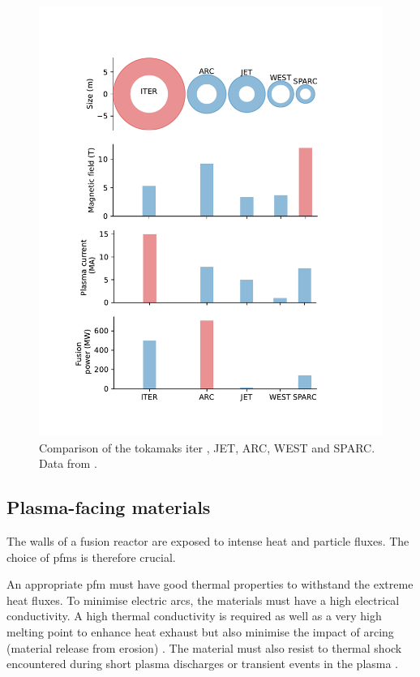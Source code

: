 \begin{figure}
    \includegraphics[width=0.9\linewidth]{Figures/Chapter1/comparison_reactors.pdf}
    \caption{Comparison of the tokamaks \acrshort{iter} , JET, ARC, WEST and SPARC. Data from \cite{delaporte-mathurin_remdelaportemathurinfusion-world_2022}.}
\end{figure}

\subsection{Plasma-facing materials}

The walls of a fusion reactor are exposed to intense heat and particle fluxes.
The choice of \glspl{pfm} is therefore crucial.

An appropriate \gls{pfm} must have good thermal properties to withstand the extreme heat fluxes.
To minimise electric arcs, the materials must have a high electrical conductivity.
A high thermal conductivity is required as well as a very high melting point to enhance heat exhaust but also minimise the impact of arcing (material release from erosion) .
The material must also resist to thermal shock encountered during short \gls{plasma} discharges or transient events in the \gls{plasma} .

